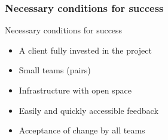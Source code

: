 \begin{frame}
    \frametitle{Necessary conditions for success}
        \begin{block}{Necessary conditions for success}
            \begin{itemize}
                \item A client fully invested in the project
                \item Small teams (pairs)
                \item Infrastructure with open space
                \item Easily and quickly accessible feedback
                \item Acceptance of change by all teams
            \end{itemize}
        \end{block}
\end{frame}
